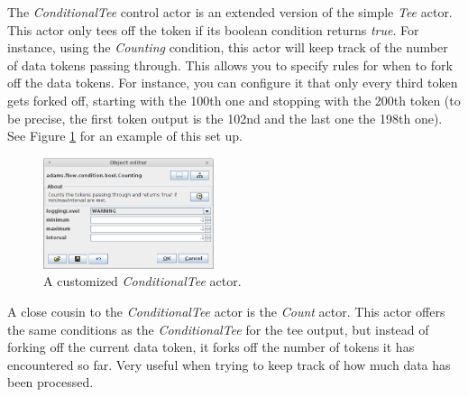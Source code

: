 The \textit{ConditionalTee} control actor is an extended version of the simple
\textit{Tee} actor. This actor only tees off the token if its boolean condition
returns \textit{true}. For instance, using the \textit{Counting} condition, this
actor will keep track of the number of data tokens passing through. This allows
you to specify rules for when to fork off the data tokens.
For instance, you can configure it that only every third token gets forked off,
starting with the 100th one and stopping with the 200th token (to be precise,
the first token output is the 102nd and the last one the 198th one). See Figure
\ref{floweditor-conditionaltee} for an example of this set up.
\begin{figure}[htb]
  \centering
  \includegraphics[width=5.0cm]{images/floweditor-conditionaltee.png}
  \caption{A customized \textit{ConditionalTee} actor.}
  \label{floweditor-conditionaltee}
\end{figure}

A close cousin to the \textit{ConditionalTee} actor is the \textit{Count} actor.
This actor offers the same conditions as the \textit{ConditionalTee} for the
tee output, but instead of forking off the current data token, it forks off the
number of tokens it has encountered so far. Very useful when trying to keep
track of how much data has been processed.


